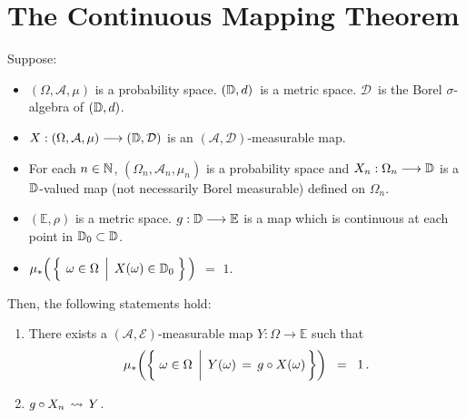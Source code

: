 

\section{The Continuous Mapping Theorem}
\setcounter{theorem}{0}
\setcounter{equation}{0}


\renewcommand{\theenumi}{\roman{enumi}}
\renewcommand{\labelenumi}{\textnormal{(\theenumi)}$\;\;$}


\begin{theorem}
\mbox{}\vskip 0.1cm
\noindent
Suppose:
\begin{itemize}
\item
	$(\Omega,\mathcal{A},\mu)$ is a probability space.
	$(\mathbb{D},d)$\, is a metric space.
	$\mathcal{D}$\, is the Borel $\sigma$-algebra of $(\mathbb{D},d)$.
\item
	$X : (\Omega,\mathcal{A},\mu) \longrightarrow (\mathbb{D},\mathcal{D})$
	is an $(\mathcal{A},\mathcal{D})$-measurable map.
\item
	For each $n \in \mathbb{N}$,
	$(\Omega_{n},\mathcal{A}_{n},\mu_{n})$ is a probability space and
	$X_{n} : \Omega_{n} \longrightarrow \mathbb{D}$
	is a $\mathbb{D}$-valued map (not necessarily Borel measurable) defined on $\Omega_{n}$.
\item
	$(\mathbb{E},\rho)$ is a metric space.
	$g : \mathbb{D} \longrightarrow \mathbb{E}$ is a map which is continuous at each point in $\mathbb{D}_{0} \subset \mathbb{D}$.
\item
	$\mu_{*}\!\left(\,\left\{\;\left.\omega\overset{{\color{white}.}}{\in}\Omega\;\,\right\vert\;X(\omega)\in\D_{0}\;\right\}\,\right)$
	\;$=$\; $1$.
\end{itemize}
Then, the following statements hold:
\begin{enumerate}
\item
	There exists a $(\mathcal{A},\mathcal{E})$-measurable map $Y : \Omega \longrightarrow \mathbb{E}$ such that
	\begin{equation*}
	\mu_{*}\!\left(\left\{\,
		\left.
		\omega \overset{{\color{white}-}}{\in} \Omega
		\;\,\right\vert\;
		Y(\omega) \,=\, g \circ X(\omega)
		\,\right\}\right)
	\;\; = \;\; 1\,.
	\end{equation*}
\item
	$g \circ X_{n} \,\rightsquigarrow\, Y$.
\end{enumerate}
\end{theorem}
\proof

